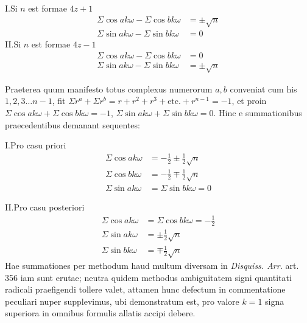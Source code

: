 \noindent I.\quad Si $n$ est formae $4z+1$
\[
\begin{aligned}
\Sigma\cos ak\omega-\Sigma\cos bk\omega&=\pm\surd n\\
\Sigma\sin ak\omega-\Sigma\sin bk\omega&=0
\end{aligned}
\]
\noindent II.\quad Si $n$ est formae $4z-1$
\[
\begin{aligned}
\Sigma\cos ak\omega-\Sigma\cos bk\omega&=0\\
\Sigma\sin ak\omega-\Sigma\sin bk\omega&=\pm\surd n
\end{aligned}
\]

Praeterea quum manifesto totus complexus numerorum $a,b$ conveniat cum his $1,2,3\dots n-1$, fit $\Sigma r^a+\Sigma r^b=r+r^2+r^3+\text{etc.}+r^{n-1}=-1$, et proin $\Sigma\cos ak\omega+\Sigma\cos bk\omega=-1$, $\Sigma\sin ak\omega+\Sigma\sin bk\omega=0$. Hinc e summationibus praecedentibus demanant sequentes:

\noindent I.\quad Pro casu priori
\[
\begin{aligned}
\Sigma\cos ak\omega&=-\tfrac12\pm\tfrac12\surd n\\
\Sigma\cos bk\omega&=-\tfrac12\mp\tfrac12\surd n\\
\Sigma\sin ak\omega&=\Sigma\sin bk\omega=0
\end{aligned}
\]

\noindent II.\quad Pro casu posteriori
\[
\begin{aligned}
\Sigma\cos ak\omega&=\Sigma\cos bk\omega=-\tfrac12\\
\Sigma\sin ak\omega&=\pm\tfrac12\surd n\\
\Sigma\sin bk\omega&=\mp\tfrac12\surd n
\end{aligned}
\]
Hae summationes per methodum haud multum diversam in \emph{Disquiss. Arr.} art. 356 iam sunt erutae; neutra quidem methodus ambiguitatem signi quantitati radicali praefigendi tollere valet, attamen hunc defectum in commentatione peculiari nuper supplevimus, ubi demonstratum est, pro valore $k=1$ signa superiora in omnibus formulis allatis accipi debere.
